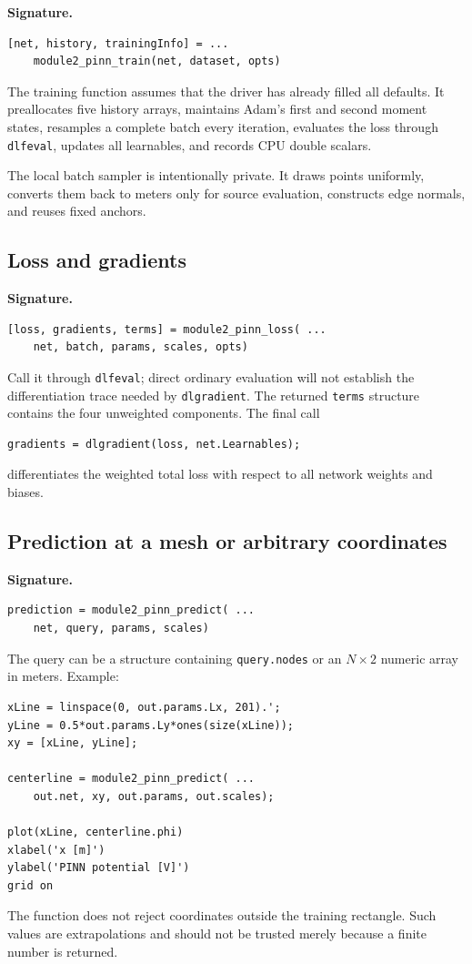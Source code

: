 \documentclass[11pt]{article}
\begin{document}
\par\smallskip\noindent\textbf{Signature.}
\begin{lstlisting}[style=projectmatlab]
[net, history, trainingInfo] = ...
    module2_pinn_train(net, dataset, opts)
\end{lstlisting}
The training function assumes that the driver has already filled all defaults. It preallocates five history arrays, maintains Adam's first and second moment states, resamples a complete batch every iteration, evaluates the loss through \texttt{dlfeval}, updates all learnables, and records CPU double scalars.

The local batch sampler is intentionally private. It draws points uniformly, converts them back to meters only for source evaluation, constructs edge normals, and reuses fixed anchors.

\subsection{Loss and gradients}

\par\smallskip\noindent\textbf{Signature.}
\begin{lstlisting}[style=projectmatlab]
[loss, gradients, terms] = module2_pinn_loss( ...
    net, batch, params, scales, opts)
\end{lstlisting}
Call it through \texttt{dlfeval}; direct ordinary evaluation will not establish the differentiation trace needed by \texttt{dlgradient}. The returned \texttt{terms} structure contains the four unweighted components. The final call
\begin{lstlisting}[style=projectmatlab]
gradients = dlgradient(loss, net.Learnables);
\end{lstlisting}
differentiates the weighted total loss with respect to all network weights and biases.

\subsection{Prediction at a mesh or arbitrary coordinates}

\par\smallskip\noindent\textbf{Signature.}
\begin{lstlisting}[style=projectmatlab]
prediction = module2_pinn_predict( ...
    net, query, params, scales)
\end{lstlisting}
The query can be a structure containing \texttt{query.nodes} or an $N\times2$ numeric array in meters. Example:
\begin{lstlisting}[style=projectmatlab]
xLine = linspace(0, out.params.Lx, 201).';
yLine = 0.5*out.params.Ly*ones(size(xLine));
xy = [xLine, yLine];

centerline = module2_pinn_predict( ...
    out.net, xy, out.params, out.scales);

plot(xLine, centerline.phi)
xlabel('x [m]')
ylabel('PINN potential [V]')
grid on
\end{lstlisting}
The function does not reject coordinates outside the training rectangle. Such values are extrapolations and should not be trusted merely because a finite number is returned.
\end{document}

